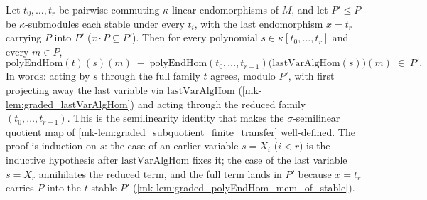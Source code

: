 \begin{lemma}\label{mk-lem:graded_polyEndHom_lastVar_sub_mem}
  \leanok

  Let \(t_0, \dots, t_r\) be pairwise-commuting \(\kappa\)-linear endomorphisms of
  \(M\), and let \(P' \le P\) be \(\kappa\)-submodules each stable under every
  \(t_i\), with the last endomorphism \(x = t_r\) carrying \(P\) into \(P'\)
  (\(x \cdot P \subseteq P'\)). Then for every polynomial
  \(s \in \kappa[t_0, \dots, t_r]\) and every \(m \in P\),
  \[
    \mathrm{polyEndHom}(t)(s)(m)
      \;-\; \mathrm{polyEndHom}(t_0, \dots, t_{r-1})
        \bigl(\mathrm{lastVarAlgHom}(s)\bigr)(m)
      \;\in\; P' .
  \]
  In words: acting by \(s\) through the full family \(t\) agrees, modulo \(P'\), with
  first projecting away the last variable via \(\mathrm{lastVarAlgHom}\)
  (\ref{mk-lem:graded_lastVarAlgHom}) and acting through the reduced family
  \((t_0, \dots, t_{r-1})\). This is the semilinearity identity that makes the
  \(\sigma\)-semilinear quotient map of \ref{mk-lem:graded_subquotient_finite_transfer}
  well-defined. The proof is induction on \(s\): the case of an earlier variable
  \(s = X_i\) (\(i < r\)) is the inductive hypothesis after \(\mathrm{lastVarAlgHom}\)
  fixes it; the case of the last variable \(s = X_r\) annihilates the reduced term,
  and the full term lands in \(P'\) because \(x = t_r\) carries \(P\) into the
  \(t\)-stable \(P'\) (\ref{mk-lem:graded_polyEndHom_mem_of_stable}).
\end{lemma}

